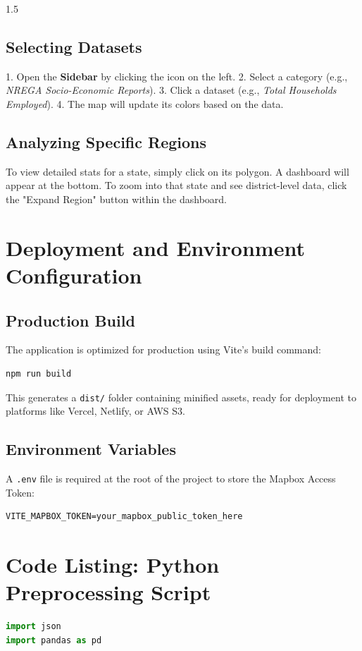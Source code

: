 \documentclass[12pt,a4paper]{report}
\begin{document}
\begin{spacing}{1.5}
\section{Selecting Datasets}
1. Open the \textbf{Sidebar} by clicking the icon on the left.
2. Select a category (e.g., \textit{NREGA Socio-Economic Reports}).
3. Click a dataset (e.g., \textit{Total Households Employed}).
4. The map will update its colors based on the data.

\section{Analyzing Specific Regions}
To view detailed stats for a state, simply click on its polygon. A dashboard will appear at the bottom. To zoom into that state and see district-level data, click the "Expand Region" button within the dashboard.

\chapter{Deployment and Environment Configuration}

\section{Production Build}
The application is optimized for production using Vite's build command:
\begin{lstlisting}[language=bash]
npm run build
\end{lstlisting}
This generates a \texttt{dist/} folder containing minified assets, ready for deployment to platforms like Vercel, Netlify, or AWS S3.

\section{Environment Variables}
A \texttt{.env} file is required at the root of the project to store the Mapbox Access Token:
\begin{lstlisting}[language=text]
VITE_MAPBOX_TOKEN=your_mapbox_public_token_here
\end{lstlisting}

\appendix
\chapter{Code Listing: Python Preprocessing Script}
\begin{lstlisting}[language=python, caption={process\_all\_nrega.py Snippet}]
import json
import pandas as pd


\end{lstlisting}
\end{spacing}
\end{document}
